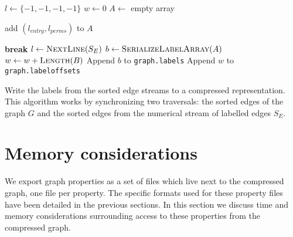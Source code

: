 \begin{algorithm}[t]
    \begin{algorithmic}
        \State $l \gets \{-1, -1, -1, -1\}$ 
         
            \State $w \gets 0$ 
             
                \State $A \gets$ empty array 
                 

                     
                        \State add $(l_\mathit{entry}, l_\mathit{perms})$ to $A$
                    \EndIf

                     
                        \State \textbf{break}
                    \Else
                        \State $l \gets \Call{NextLine}{S_E}$
                    \EndIf
                \EndWhile
                \State $b \gets \Call{SerializeLabelArray}{A}$
                \State $w \gets w + \Call{Length}{B}$
                \State Append $b$ to \texttt{graph.labels}
            \EndFor
            \State Append $w$ to \texttt{graph.labeloffsets}
        \EndFor
        \EndFunction
    \end{algorithmic}

    \caption{Write the labels from the sorted edge streams to a compressed
    representation. This algorithm works by synchronizing two traversals: the
sorted edges of the graph $G$ and the sorted edges from the numerical stream of
labelled edges $S_E$.}%
    \label{algo:label-writing}
\end{algorithm}

\section{Memory considerations}

We export graph properties as a set of files which live next to the compressed
graph, one file per property. The specific formats used for these property
files have been detailed in the previous sections. In this section we discuss
time and memory considerations surrounding access to these properties from the
compressed graph.

